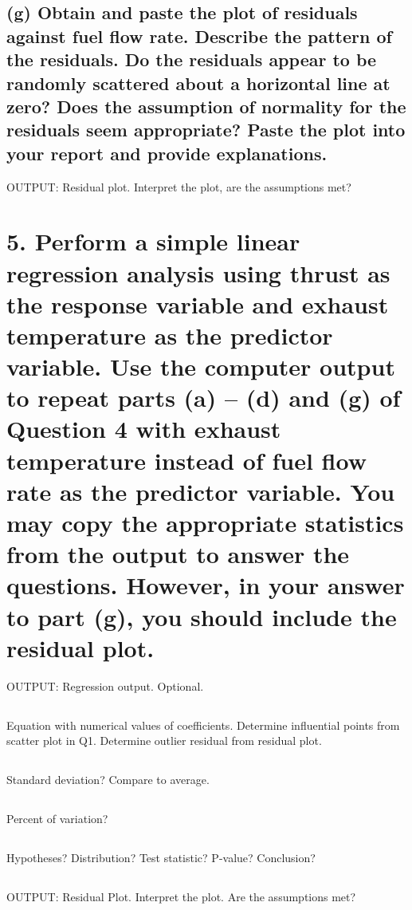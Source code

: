 \documentclass[letterpaper]{article}
\begin{document}
\subsection{(g)	Obtain and paste the plot of residuals against fuel flow rate. Describe the pattern of the residuals. Do the residuals appear to be randomly scattered about a horizontal line at zero? Does the assumption of normality for the residuals seem appropriate? Paste the plot into your report and provide explanations.}
OUTPUT: Residual plot. Interpret the plot, are the assumptions met?

\section{5.	Perform a simple linear regression analysis using thrust as the response variable and exhaust temperature as the predictor variable. Use the computer output to repeat parts (a) – (d) and (g) of Question 4 with exhaust temperature instead of fuel flow rate as the predictor variable. You may copy the appropriate statistics from the output to answer the questions. However, in your answer to part (g), you should include the residual plot.}
OUTPUT: Regression output. Optional.

\subsection{}
Equation with numerical values of coefficients. Determine
influential points from scatter plot in Q1. Determine outlier residual from residual plot.

\subsection{}
Standard deviation? Compare to average.

\subsection{}
Percent of variation?

\subsection{}
Hypotheses? Distribution? Test statistic? P-value? Conclusion?

\setcounter{subsection}{6}
\subsection{}
OUTPUT: Residual Plot. Interpret the plot. Are the assumptions met?
\end{document}
